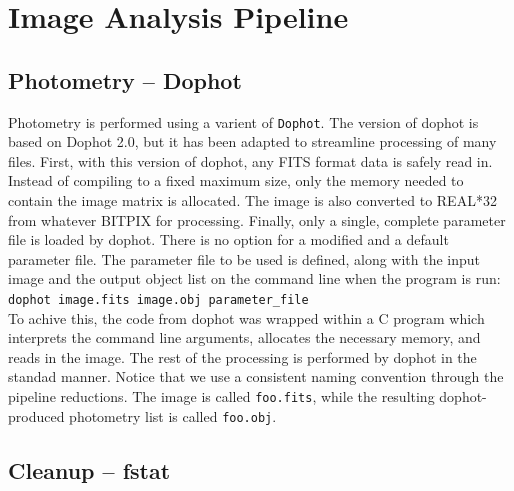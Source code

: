 \documentclass{article}
\begin{document}
\section{Image Analysis Pipeline}
\subsection{Photometry -- Dophot}

Photometry is performed using a varient of {\tt Dophot}.  The version
of dophot is based on Dophot 2.0, but it has been adapted to
streamline processing of many files.  First, with this version of
dophot, any FITS format data is safely read in.  Instead of compiling
to a fixed maximum size, only the memory needed to contain the image
matrix is allocated.  The image is also converted to REAL*32 from
whatever BITPIX for processing.  Finally, only a single, complete
parameter file is loaded by dophot.  There is no option for a modified
and a default parameter file.  The parameter file to be used is
defined, along with the input image and the output object list on the
command line when the program is run: \\
{\tt dophot image.fits image.obj parameter\_file} \\
To achive this, the code from dophot was wrapped within a C program
which interprets the command line arguments, allocates the necessary
memory, and reads in the image.  The rest of the processing is
performed by dophot in the standad manner.  Notice that we use a
consistent naming convention through the pipeline reductions.  The
image is called {\tt foo.fits}, while the resulting dophot-produced
photometry list is called {\tt foo.obj}.  

\subsection{Cleanup -- fstat}
\end{document}
